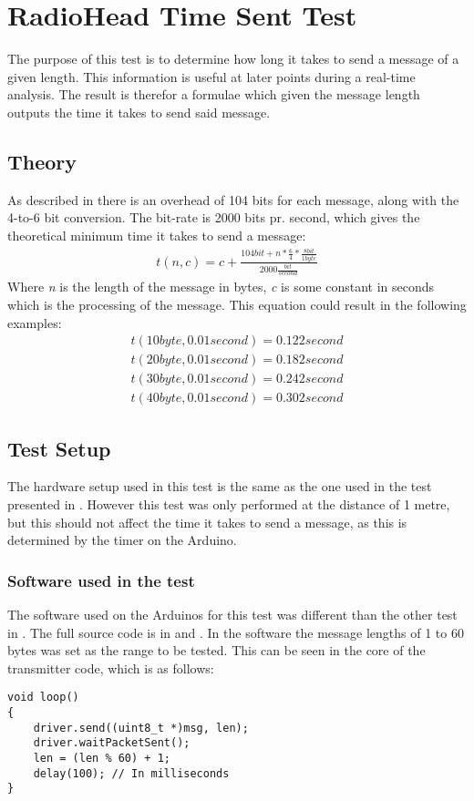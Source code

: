 \section{RadioHead Time Sent Test}\label{subsec:RHTST}
The purpose of this test is to determine how long it takes to send a message of a given length.
This information is useful at later points during a real-time analysis.
The result is therefor a formulae which given the message length outputs the time it takes to send said message. 

\subsection{Theory}
As described in  there is an overhead of 104 bits for each message, along with the 4-to-6 bit conversion.
The bit-rate is 2000 bits pr. second, which gives the theoretical minimum time it takes to send a message:
\begin{align*}
t(n,c)=c+\frac { 104 bit+n*\frac { 6 }{ 4 } *\frac { 8 bit }{ 1 byte }  }{ 2000\frac { bit }{ second }  } 
\end{align*}
Where \textit{n} is the length of the message in bytes, \textit{c} is some constant in seconds which is the processing of the message. This equation could result in the following examples:
\begin{align*}
t(10 byte, 0.01 second) = 0.122 second\\
t(20 byte, 0.01 second) = 0.182 second\\
t(30 byte, 0.01 second) = 0.242 second\\
t(40 byte, 0.01 second) = 0.302 second
\end{align*}

\subsection{Test Setup}
The hardware setup used in this test is the same as the one used in the test presented in .
However this test was only performed at the distance of 1 metre, but this should not affect the time it takes to send a message, as this is determined by the timer on the Arduino.

\subsubsection{Software used in the test}
The software used on the Arduinos for this test was different than the other test in . 
The full source code is in  and .
In the software the message lengths of 1 to 60 bytes was set as the range to be tested. This can be seen in the core of the transmitter code, which is as follows:
\begin{lstlisting}[style=customc, frame=single]
void loop()
{
    driver.send((uint8_t *)msg, len);
    driver.waitPacketSent();
    len = (len % 60) + 1;
    delay(100); // In milliseconds 
}
\end{lstlisting}

